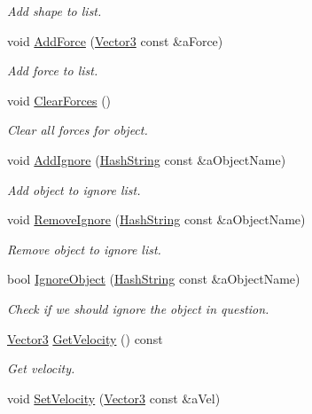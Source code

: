 \begin{DoxyCompactItemize}
\begin{DoxyCompactList}\small\item\em Add shape to list. \end{DoxyCompactList}\item 
void \hyperlink{classPhysicsObject_a277ca93d4df1335280937a3b9f2a4fb5}{Add\+Force} (\hyperlink{structVector3}{Vector3} const \&a\+Force)
\begin{DoxyCompactList}\small\item\em Add force to list. \end{DoxyCompactList}\item 
void \hyperlink{classPhysicsObject_a2b597c7e65767767d069daa2fc9406f0}{Clear\+Forces} ()
\begin{DoxyCompactList}\small\item\em Clear all forces for object. \end{DoxyCompactList}\item 
void \hyperlink{classPhysicsObject_abc72c35ca692d673a1184954878b0eba}{Add\+Ignore} (\hyperlink{classHashString}{Hash\+String} const \&a\+Object\+Name)
\begin{DoxyCompactList}\small\item\em Add object to ignore list. \end{DoxyCompactList}\item 
void \hyperlink{classPhysicsObject_addc05243ec1db94498a53eacc0584b4b}{Remove\+Ignore} (\hyperlink{classHashString}{Hash\+String} const \&a\+Object\+Name)
\begin{DoxyCompactList}\small\item\em Remove object to ignore list. \end{DoxyCompactList}\item 
bool \hyperlink{classPhysicsObject_ad6268b62e3d4168ff151ee546665a827}{Ignore\+Object} (\hyperlink{classHashString}{Hash\+String} const \&a\+Object\+Name)
\begin{DoxyCompactList}\small\item\em Check if we should ignore the object in question. \end{DoxyCompactList}\item 
\hyperlink{structVector3}{Vector3} \hyperlink{classPhysicsObject_aa1a7310ac309d4855355d8752e021c06}{Get\+Velocity} () const 
\begin{DoxyCompactList}\small\item\em Get velocity. \end{DoxyCompactList}\item 
void \hyperlink{classPhysicsObject_aaa5ec6a00a68a6a170c149b6a9b40af1}{Set\+Velocity} (\hyperlink{structVector3}{Vector3} const \&a\+Vel)

\end{DoxyCompactItemize}
